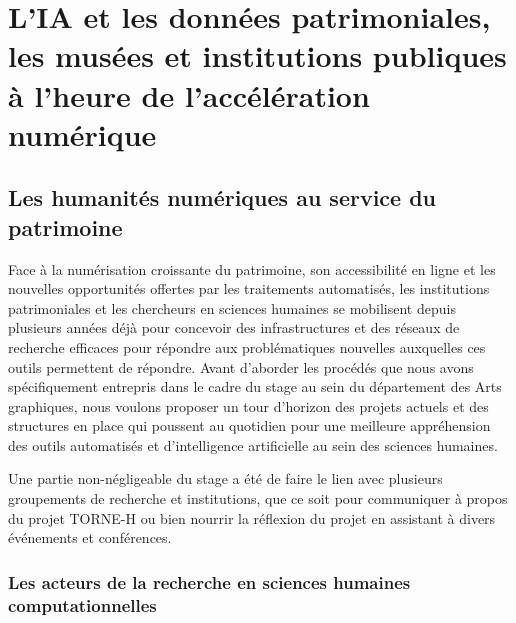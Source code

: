 \part{L’IA et les données patrimoniales, les musées et institutions publiques à l'heure de l'accélération numérique}


\chapter{Les humanités numériques au service du patrimoine}

Face à la numérisation croissante du patrimoine, son accessibilité en ligne et les nouvelles opportunités offertes par les traitements automatisés, les institutions patrimoniales et les chercheurs en sciences humaines se mobilisent depuis plusieurs années déjà pour concevoir des infrastructures et des réseaux de recherche efficaces pour répondre aux problématiques nouvelles auxquelles ces outils permettent de répondre. Avant d'aborder les procédés que nous avons spécifiquement entrepris dans le cadre du stage au sein du département des Arts graphiques, nous voulons proposer un tour d'horizon des projets actuels et des structures en place qui poussent au quotidien pour une meilleure appréhension des outils automatisés et d'intelligence artificielle au sein des sciences humaines.

Une partie non-négligeable du stage a été de faire le lien avec plusieurs groupements de recherche et institutions, que ce soit pour communiquer à propos du projet TORNE-H ou bien nourrir la réflexion du projet en assistant à divers événements et conférences. 

\section{Les acteurs de la recherche en sciences humaines computationnelles}


